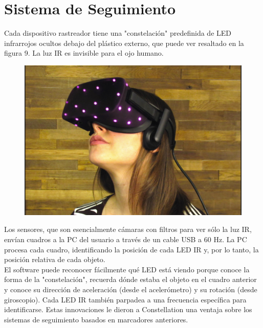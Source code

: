 \section{Sistema de Seguimiento}
Cada dispositivo rastreador tiene una "constelación" predefinida de LED infrarrojos ocultos debajo del plástico externo, que puede ver resaltado en la figura 9. La luz IR es invisible para el ojo humano.\\
\begin{figure}[H]
	\begin{center}
 		\includegraphics[width = 1\textwidth]{source/images/image55.png}
	\end{center} 
\end{figure}
Los sensores, que son esencialmente cámaras con filtros para ver sólo la luz IR, envían cuadros a la PC del usuario a través de un cable USB a 60 Hz. La PC procesa cada cuadro, identificando la posición de cada LED IR y, por lo tanto, la posición relativa de cada objeto.\\
El software puede reconocer fácilmente qu\'e LED est\'a viendo porque conoce la forma de la "constelaci\'on", recuerda dónde estaba el objeto en el cuadro anterior y conoce su dirección de aceleración (desde el acelerómetro) y su rotación (desde giroscopio). Cada LED IR también parpadea a una frecuencia específica para identificarse. Estas innovaciones le dieron a Constellation una ventaja sobre los sistemas de seguimiento basados ​​en marcadores anteriores.\\
